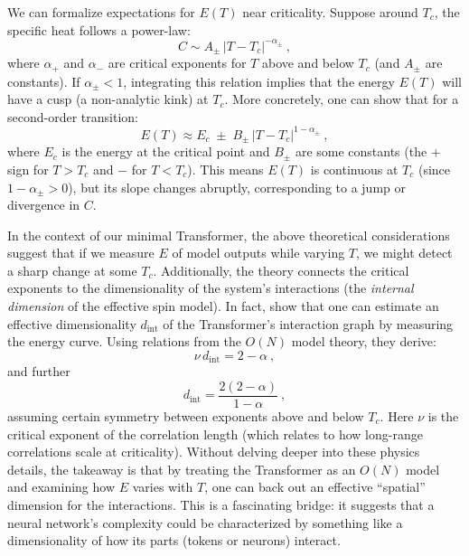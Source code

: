 \documentclass[12pt]{article}
\begin{document}
We can formalize expectations for $E(T)$ near criticality. Suppose around $T_c$, the specific heat follows a power-law:
\begin{equation}
C \sim A_{\pm}\, |T - T_c|^{-\alpha_{\pm}}~,
\end{equation}
where $\alpha_+$ and $\alpha_-$ are critical exponents for $T$ above and below $T_c$ (and $A_{\pm}$ are constants). If $\alpha_{\pm} < 1$, integrating this relation implies that the energy $E(T)$ will have a cusp (a non-analytic kink) at $T_c$. More concretely, one can show \citep{sun2025} that for a second-order transition:
\begin{equation}
E(T) \approx E_c \; \pm \; B_{\pm}\, |T - T_c|^{1-\alpha_{\pm}}~,
\end{equation}
where $E_c$ is the energy at the critical point and $B_{\pm}$ are some constants (the $+$ sign for $T>T_c$ and $-$ for $T<T_c$). This means $E(T)$ is continuous at $T_c$ (since $1-\alpha_{\pm}>0$), but its slope changes abruptly, corresponding to a jump or divergence in $C$.

In the context of our minimal Transformer, the above theoretical considerations suggest that if we measure $E$ of model outputs while varying $T$, we might detect a sharp change at some $T_c$. Additionally, the theory connects the critical exponents to the dimensionality of the system's interactions (the \emph{internal dimension} of the effective spin model). In fact, \citet{sun2025} show that one can estimate an effective dimensionality $d_{\text{int}}$ of the Transformer’s interaction graph by measuring the energy curve. Using relations from the $O(N)$ model theory, they derive:
\begin{equation}
\nu\, d_{\text{int}} = 2 - \alpha~,
\end{equation}
and further 
\begin{equation}
d_{\text{int}} = \frac{2(2 - \alpha)}{1 - \alpha}~,
\end{equation}
assuming certain symmetry between exponents above and below $T_c$. Here $\nu$ is the critical exponent of the correlation length (which relates to how long-range correlations scale at criticality). Without delving deeper into these physics details, the takeaway is that by treating the Transformer as an $O(N)$ model and examining how $E$ varies with $T$, one can back out an effective ``spatial'' dimension for the interactions. This is a fascinating bridge: it suggests that a neural network's complexity could be characterized by something like a dimensionality of how its parts (tokens or neurons) interact.
\end{document}
